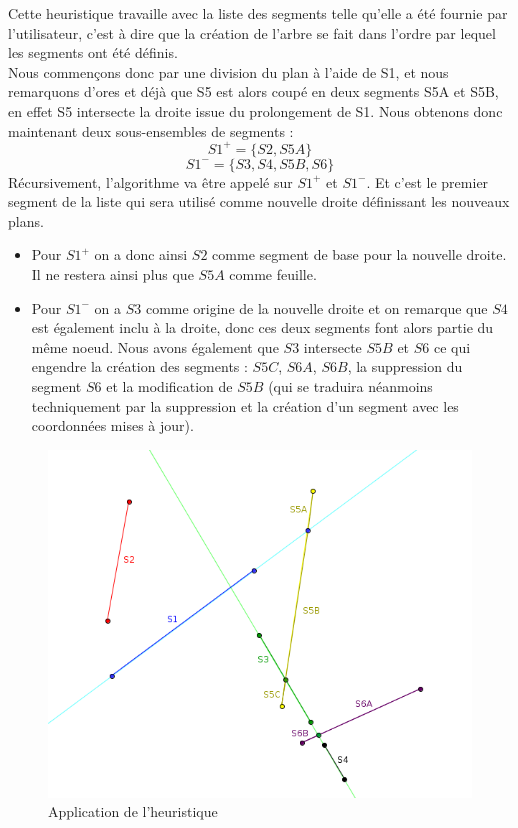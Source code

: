 \documentclass[11pt,a4paper]{article}
\begin{document}
Cette heuristique travaille avec la liste des segments telle qu'elle a été fournie par l'utilisateur, c'est à dire que la création de l'arbre se fait dans l'ordre par lequel les segments ont été définis. \\

Nous commençons donc par une division du plan à l'aide de S1, et nous remarquons d'ores et déjà que S5 est alors coupé en deux segments S5A et S5B, en effet S5 intersecte la droite issue du prolongement de S1. Nous obtenons donc maintenant deux sous-ensembles de segments : 
$$S1^+ = \{S2, S5A\}$$
$$S1^- = \{S3,S4,S5B,S6\}$$
Récursivement, l'algorithme va être appelé sur $S1^+$ et $S1^-$. Et c'est le premier segment de la liste qui sera utilisé comme nouvelle droite définissant les nouveaux plans. 
\begin{itemize}
\item Pour $S1^+$ on a donc ainsi $S2$ comme segment de base pour la nouvelle droite. Il ne restera ainsi plus que $S5A$ comme feuille. 
\item Pour $S1^-$ on a $S3$ comme origine de la nouvelle droite et on remarque que $S4$ est également inclu à la droite, donc ces deux segments font alors partie du même noeud. Nous avons également que $S3$ intersecte $S5B$ et $S6$ ce qui engendre la création des segments : $S5C$, $S6A$, $S6B$, la suppression du segment $S6$ et la modification de $S5B$ (qui se traduira néanmoins techniquement par la suppression et la création d'un segment avec les coordonnées mises à jour). 
\end{itemize}

\begin{figure}[!h]
\centering
\includegraphics[scale=0.6]{bsp_ex_2.png}
\caption{Application de l'heuristique}
\label{bsp_inordre}
\end{figure}
\end{document}
